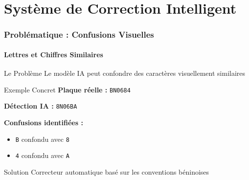 \documentclass[
	11pt,
	aspectratio=169,
]{beamer}
\begin{document}

\section{Système de Correction Intelligent}

\begin{frame}
	\frametitle{Problématique : Confusions Visuelles}
	\framesubtitle{Lettres et Chiffres Similaires}
	
	\begin{alertblock}{Le Problème}
		Le modèle IA peut confondre des caractères visuellement similaires
	\end{alertblock}
	
	\smallskip
	
	\begin{exampleblock}{Exemple Concret}
		\textbf{Plaque réelle :} \texttt{BN0684}
		
		\textbf{Détection IA :} \texttt{8N06BA}
		
		\smallskip
		
		\textbf{Confusions identifiées :}
		\begin{itemize}
			\item \texttt{B} confondu avec \texttt{8}
			\item \texttt{4} confondu avec \texttt{A}
		\end{itemize}
	\end{exampleblock}
	
	\smallskip
	
	\begin{block}{Solution}
		\centering
		\alert{Correcteur automatique} basé sur les conventions béninoises
	\end{block}
\end{frame}

\end{document}
